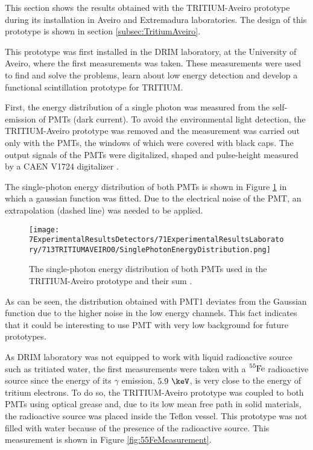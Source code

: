 This section shows the results obtained with the TRITIUM-Aveiro prototype during its installation in Aveiro and Extremadura laboratories. The design of this prototype is shown in section \ref{subsec:TritiumAveiro}.

This prototype was first installed in the DRIM laboratory, at the University of Aveiro, where the first measurements was taken. These measurements were used to find and solve the problems, learn about low energy detection and develop a functional scintillation prototype for TRITIUM. 

First, the energy distribution of a single photon was measured from the self-emission of PMTs (dark current). To avoid the environmental light detection, the TRITIUM-Aveiro prototype was removed and the measurement was carried out only with the PMTs, the windows of which were covered with black caps. The output signals of the PMTs were digitalized, shaped and pulse-height measured by a CAEN V1724 digitalizer \cite{CAENV1724}.

The single-photon energy distribution of both PMTs is shown in Figure \ref{fig:SinglePhotonEnergyDistribution} in which a gaussian function was fitted. Due to the electrical noise of the PMT, an extrapolation (dashed line) was needed to be applied.

\begin{figure}[h]
\centering
\texttt{[image: 7ExperimentalResultsDetectors/71ExperimentalResultsLaboratory/713TRITIUMAVEIRO0/SinglePhotonEnergyDistribution.png]}
\caption{The single-photon energy distribution of both PMTs used in the TRITIUM-Aveiro prototype and their sum \cite{ExperimentalPaperCarlos}.\label{fig:SinglePhotonEnergyDistribution}}
\end{figure}

As can be seen, the distribution obtained with PMT1 deviates from the Gaussian function due to the higher noise in the low energy channels. This fact indicates that it could be interesting to use PMT with very low background for future prototypes.

As DRIM laboratory was not equipped to work with liquid radioactive source such as tritiated water, the first measurements were taken with a $\ce{^{55}Fe}$ radioactive source since the energy of its $\gamma$ emission, $5.9~\keV$, is very close to the energy of tritium electrons. To do so, the TRITIUM-Aveiro prototype was coupled to both PMTs using optical grease and, due to its low mean free path in solid materials, the radioactive source was placed inside the Teflon vessel. This prototype was not filled with water because of the presence of the radioactive source. This measurement is shown in Figure \ref{fig:55FeMeasurement}.

